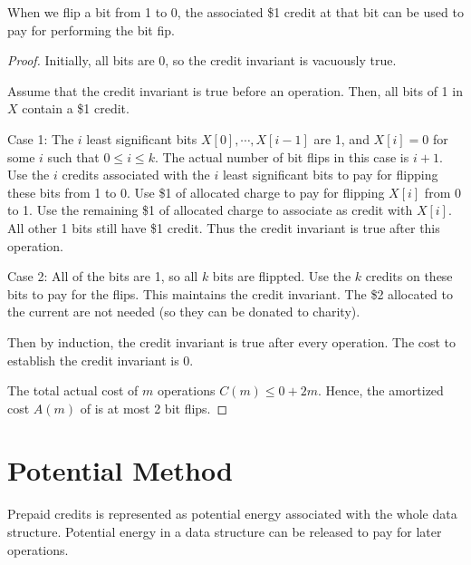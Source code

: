 When we flip a bit from 1 to 0, the associated \$1 credit at that bit can be used to pay for performing the bit fip.

\begin{proof}
    Initially, all bits are 0, so the credit invariant is vacuously true.

    Assume that the credit invariant is true before an  operation. Then, all bits of 1 in $X$ contain a \$1 credit.

    Case 1: The $i$ least significant bits $X[0],\cdots,X[i-1]$ are 1, and $X[i] = 0$ for some $i$ such that $0 \leq i \leq k$. The actual number of bit flips in this case is $i+1$. Use the $i$ credits associated with the $i$ least significant bits to pay for flipping these bits from 1 to 0. Use \$1 of allocated charge to pay for flipping $X[i]$ from 0 to 1. Use the remaining \$1 of allocated charge to associate as credit with $X[i]$. All other 1 bits still have \$1 credit. Thus the credit invariant is true after this  operation.

    Case 2: All of the bits are 1, so all $k$ bits are flippted. Use the $k$ credits on these bits to pay for the flips. This maintains the credit invariant. The \$2 allocated to the current  are not needed (so they can be donated to charity).

    Then by induction, the credit invariant is true after every  operation. The cost to establish the credit invariant is 0.

    The total actual cost of $m$ operations $C(m) \leq 0 + 2m$. Hence, the amortized cost $A(m)$ of  is at most 2 bit flips.  
\end{proof}

\section{Potential Method}

\vspace{\parskip}

Prepaid credits is represented as potential energy associated with the whole data structure. Potential energy in a data structure can be released to pay for later operations.

